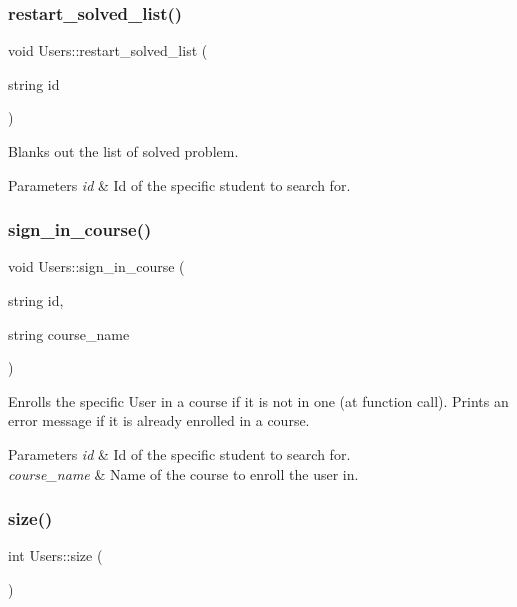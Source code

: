 \subsubsection{\texorpdfstring{restart\+\_\+solved\+\_\+list()}{restart\_solved\_list()}}
{\footnotesize\ttfamily void Users\+::restart\+\_\+solved\+\_\+list (\begin{DoxyParamCaption}\item[{string}]{id }\end{DoxyParamCaption})}

Blanks out the list of solved problem. 
\begin{DoxyParams}{Parameters}
{\em id} & Id of the specific student to search for. \\
\hline
\end{DoxyParams}
\mbox{\label{classUsers_af8c6f786e9779942209f73ac4b92ec43}} 
\subsubsection{\texorpdfstring{sign\+\_\+in\+\_\+course()}{sign\_in\_course()}}
{\footnotesize\ttfamily void Users\+::sign\+\_\+in\+\_\+course (\begin{DoxyParamCaption}\item[{string}]{id,  }\item[{string}]{course\+\_\+name }\end{DoxyParamCaption})}

Enrolls the specific User in a course if it is not in one (at function call). Prints an error message if it is already enrolled in a course. 
\begin{DoxyParams}{Parameters}
{\em id} & Id of the specific student to search for. \\
\hline
{\em course\+\_\+name} & Name of the course to enroll the user in. \\
\hline
\end{DoxyParams}
\mbox{\label{classUsers_a1be44c97e71f822f29ca61451c7e472a}} 
\subsubsection{\texorpdfstring{size()}{size()}}
{\footnotesize\ttfamily int Users\+::size (\begin{DoxyParamCaption}{ }\end{DoxyParamCaption})}

